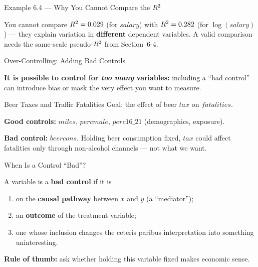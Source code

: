 \documentclass[aspectratio=169, 12pt]{beamer}
\begin{document}
\begin{frame}{Example 6.4 --- Why You Cannot Compare the $R^2$}

  \begin{keybox}
    You cannot compare $R^2 = 0.029$ (for $salary$) with $R^2 = 0.282$ (for
    $\log(salary)$) --- they explain variation in \textbf{different} dependent variables.
    A valid comparison needs the same-scale pseudo-$R^2$ from Section~6-4.
  \end{keybox}

\end{frame}

\begin{frame}{Over-Controlling: Adding Bad Controls}

  \textbf{It is possible to control for \emph{too many} variables:} including a
  ``bad control'' can introduce bias or mask the very effect you want to measure.

  \medskip

  \begin{examplebox}{Beer Taxes and Traffic Fatalities}
    Goal: the effect of beer $tax$ on $fatalities$.

    \smallskip
    \textbf{Good controls:} $miles$, $percmale$, $perc16\_21$ (demographics, exposure).

    \smallskip
    \textbf{Bad control:} $beercons$. Holding beer consumption fixed, $tax$ could affect
    fatalities only through non-alcohol channels --- not what we want.
  \end{examplebox}

\end{frame}

\begin{frame}{When Is a Control ``Bad''?}

  \begin{keybox}
    A variable is a \textbf{bad control} if it is
    \begin{enumerate}
      \item on the \textbf{causal pathway} between $x$ and $y$ (a ``mediator'');
      \item an \textbf{outcome} of the treatment variable;
      \item one whose inclusion changes the ceteris paribus interpretation into
        something uninteresting.
    \end{enumerate}

    \smallskip
    \textbf{Rule of thumb:} ask whether holding this variable fixed makes economic sense.
  \end{keybox}

\end{frame}
\end{document}
